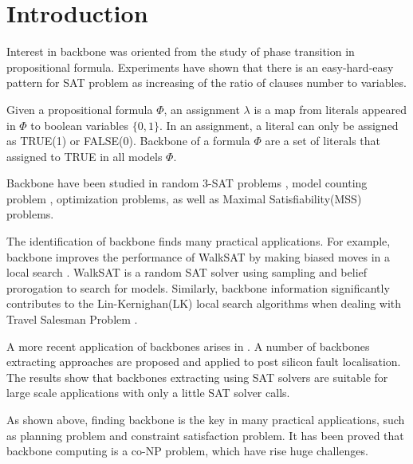 
\section{Introduction}

Interest in backbone was oriented from the study of phase transition in propositional formula.
Experiments have shown that there is an easy-hard-easy pattern for SAT problem as increasing of the ratio of clauses number to variables.

Given a propositional formula $\Phi$, an assignment $\lambda$ is a map from literals appeared in $\Phi$ to boolean variables $\{0,1\}$. In an assignment, a literal can only be assigned as TRUE(1) or FALSE(0).
Backbone of a formula $\Phi$ are a set of literals that assigned to TRUE in all models $\Phi$\cite{BCJ2001,KPJ2005,MJML2010}.

Backbone have been studied in random 3-SAT problems \cite{DOG2001}, model counting problem \cite{IMM2016}, optimization problems\cite{CJG2001,KPS2005,WTS2001}, as well as Maximal Satisfiability(MSS) problems\cite{MM2005}.

The identification of backbone finds many practical applications. For example, backbone improves the performance of WalkSAT \cite{SBK1993} by making biased moves in a local search \cite{ZWR2003}. WalkSAT is a random SAT solver using sampling and belief prorogation \cite{MAR2007} to search for models. Similarly, backbone information significantly contributes to the Lin-Kernighan(LK) local search algorithms when dealing with Travel Salesman Problem \cite{ZWL2005}.

A more recent application of backbones arises in \cite{Z11}. A number of backbones extracting approaches are proposed and applied to post silicon fault localisation. The results show that backbones extracting using SAT solvers are suitable for large scale applications with only a little SAT solver calls.

As shown above, finding backbone is the key in many practical applications, such as planning problem and constraint satisfaction problem. It has been proved that backbone computing is a co-NP problem\cite{Jan10}, which have rise huge challenges.


